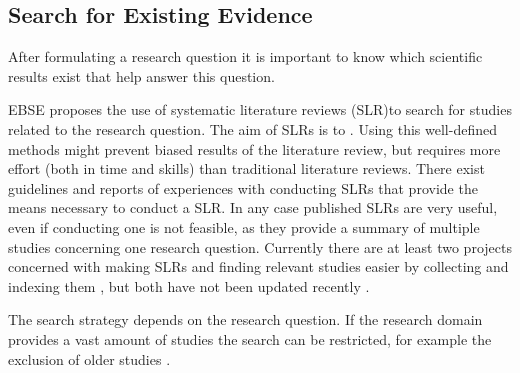 \subsection{Search for Existing Evidence}
\label{subsec:search for existing evidence} 

After formulating a research question it is important to know which scientific results exist that help answer this question.

EBSE proposes the use of systematic literature reviews (SLR)to search for studies related to the research question. The aim of SLRs is to  \cite{Zhang2011}. Using this well-defined methods might prevent biased results of the literature review, but requires more effort (both in time and skills) than traditional literature reviews. There exist guidelines \cite{keele2007,Wohlin2014,Zhang2011}  and reports of experiences with conducting SLRs \cite{Brereton2007} that provide the means necessary to conduct a SLR.
In any case published SLRs are very useful, even if conducting one is not feasible, as they provide a summary of multiple studies concerning one research question. Currently there are at least two projects concerned with making SLRs and finding relevant studies easier by collecting and indexing them , but both have not been updated recently .

\newline
The search strategy depends on the research question. If the research domain provides a vast amount of studies the search can  be restricted, for example the exclusion of older studies \cite{Brereton2007}.

